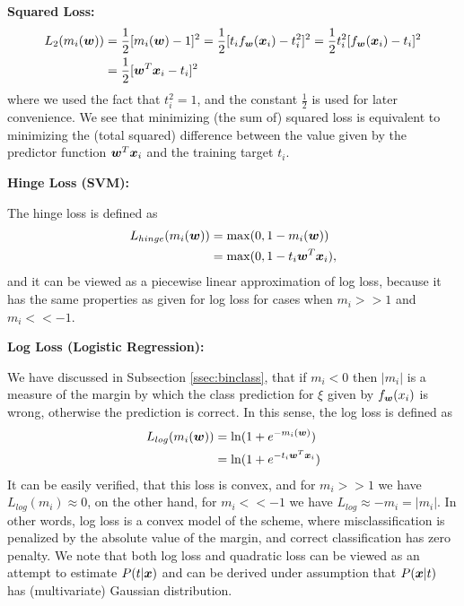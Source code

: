 {\bf Squared Loss:}
\begin{align}
L_2(m_i(\boldsymbol{w})) &= \frac{1}{2}[m_i(\boldsymbol{w}) - 1]^2 = \frac{1}{2}[t_i f_{\boldsymbol{w}}(\boldsymbol{x}_i) - t_i^2]^2 = \frac{1}{2}t_i^2 [f_{\boldsymbol{w}}(\boldsymbol{x}_i) - t_i]^2 \nonumber \\
& = \frac{1}{2}[\boldsymbol{w}^T\boldsymbol{x}_i - t_i]^2 \label{eq:loss2}
\end{align}
where we used the fact that $t_i^2 = 1$, and the constant
$\frac{1}{2}$ is used for later convenience. We see that minimizing
(the sum of) squared loss is equivalent to minimizing the (total
squared) difference between the value given by the predictor function
$\boldsymbol{w}^T\boldsymbol{x}_i$ and the training target $t_i$.

{\bf Hinge Loss (SVM):}

The hinge loss is defined as
\[ \begin{split}
L_{hinge}(m_i(\boldsymbol{w})) &= \max(0, 1 - m_i(\boldsymbol{w})) \\
&= \max(0, 1 - t_i \boldsymbol{w}^T \boldsymbol{x}_i),
\end{split} \] 
and it can be viewed as a piecewise linear approximation of log loss,
because it has the same properties as given for log loss for cases
when $m_i >> 1$ and $m_i << -1$.

{\bf Log Loss (Logistic Regression):}

We have discussed in Subsection \ref{ssec:binclass}, that if $m_i < 0$
then $|m_i|$ is a measure of the margin by which the class prediction
for $\xi$ given by $f_{\boldsymbol{w}}(x_i)$ is wrong, otherwise the prediction is
correct. In this sense, the log loss is defined as
\[ \begin{split}
L_{log}(m_i(\boldsymbol{w})) &= \ln (1 + e^{-m_i(\boldsymbol{w})}) \\
 &= \ln (1 + e^{-t_i\boldsymbol{w}^T\boldsymbol{x}_i}) 
\end{split} \] 
It can be easily verified, that this loss is convex, and for $m_i >>
1$ we have $L_{log}(m_i) \approx 0$, on the other hand, for $m_i <<
-1$ we have $L_{log} \approx -m_i = |m_i|$. In other words, log loss
is a convex model of the scheme, where misclassification is penalized
by the absolute value of the margin, and correct classification has
zero penalty. We note that both log loss and quadratic loss can be
viewed as an attempt to estimate $P(t|\boldsymbol{x})$ and can be derived under
assumption that $P(\boldsymbol{x}|t)$ has (multivariate) Gaussian distribution.

\ENDMYCOMMENT



